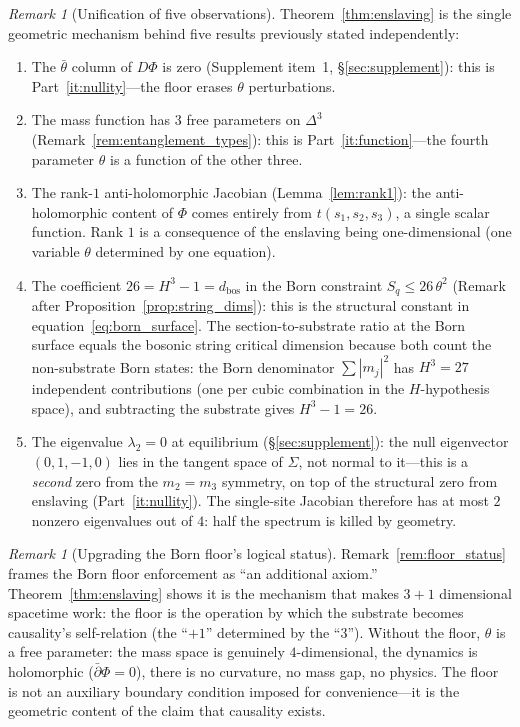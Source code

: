 \documentclass[11pt,a4paper]{article}
\theoremstyle{definition}
\theoremstyle{remark}
\newtheorem{remark}[theorem]{Remark}
\newcommand{\dbar}{\bar{\partial}}
\begin{document}
\begin{remark}[Unification of five observations]\label{rem:enslaving_unification}
Theorem~\ref{thm:enslaving} is the single geometric mechanism behind five results previously stated independently:
\begin{enumerate}[nosep]
\item The $\bar{\theta}$ column of $D\Phi$ is zero (Supplement item~1, \S\ref{sec:supplement}): this is Part~\ref{it:nullity}---the floor erases $\theta$ perturbations.
\item The mass function has $3$ free parameters on $\Delta^3$ (Remark~\ref{rem:entanglement_types}): this is Part~\ref{it:function}---the fourth parameter $\theta$ is a function of the other three.
\item The rank-$1$ anti-holomorphic Jacobian (Lemma~\ref{lem:rank1}): the anti-holomorphic content of $\Phi$ comes entirely from $t(s_1,s_2,s_3)$, a single scalar function. Rank $1$ is a consequence of the enslaving being one-dimensional (one variable $\theta$ determined by one equation).
\item The coefficient $26=H^3-1=d_\mathrm{bos}$ in the Born constraint $S_q\leq 26\,\theta^2$ (Remark after Proposition~\ref{prop:string_dims}): this is the structural constant in equation~\eqref{eq:born_surface}. The section-to-substrate ratio at the Born surface equals the bosonic string critical dimension because both count the non-substrate Born states: the Born denominator $\sum|m_j|^2$ has $H^3=27$ independent contributions (one per cubic combination in the $H$-hypothesis space), and subtracting the substrate gives $H^3-1=26$.
\item The eigenvalue $\lambda_2=0$ at equilibrium (\S\ref{sec:supplement}): the null eigenvector $(0,1,-1,0)$ lies in the tangent space of $\Sigma$, not normal to it---this is a \emph{second} zero from the $m_2=m_3$ symmetry, on top of the structural zero from enslaving (Part~\ref{it:nullity}). The single-site Jacobian therefore has at most $2$ nonzero eigenvalues out of $4$: half the spectrum is killed by geometry.
\end{enumerate}
\end{remark}

\begin{remark}[Upgrading the Born floor's logical status]\label{rem:floor_upgrade}
Remark~\ref{rem:floor_status} frames the Born floor enforcement as ``an additional axiom.'' Theorem~\ref{thm:enslaving} shows it is the mechanism that makes $3+1$ dimensional spacetime work: the floor is the operation by which the substrate becomes causality's self-relation (the ``$+1$'' determined by the ``$3$''). Without the floor, $\theta$ is a free parameter: the mass space is genuinely $4$-dimensional, the dynamics is holomorphic ($\dbar\Phi=0$), there is no curvature, no mass gap, no physics. The floor is not an auxiliary boundary condition imposed for convenience---it is the geometric content of the claim that causality exists.
\end{remark}
\end{document}
